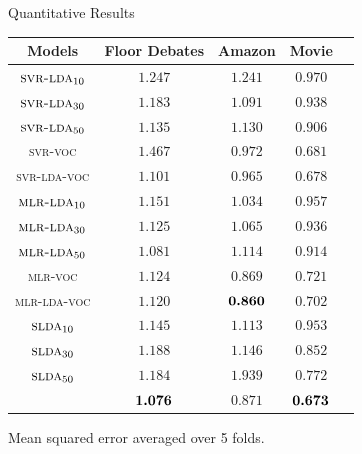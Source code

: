 \documentclass[xcolor=dvipsnames]{beamer}
\newcommand{\abr}[1]{\textsc{#1}}
\newcommand{\lda}[0]{\abr{lda}}
\newcommand{\slda}[0]{\abr{slda}}
\newcommand{\bm}[1]{\mbox{\boldmath$#1$}}
\begin{document}
\begin{frame}{Quantitative Results}

\centering

\begin{tabular}{|c||c|c|c|c|}
  \hline
Models & Floor Debates & Amazon & Movie \\
  \hline
  $\textsc{svr-}\lda{}_{10}$     & $1.247$       & $1.241$ & $0.970$ \\
  $\textsc{svr-}\lda{}_{30}$     & $1.183$       & $1.091$ & $0.938$ \\
  $\textsc{svr-}\lda{}_{50}$     & $1.135$       & $1.130$ & $0.906$ \\
  {\textsc{svr-voc}}             & $1.467$       & $0.972$ & $0.681$\\
  {\textsc{svr-lda-voc}}         & $1.101$       & $0.965$ & $0.678$\\ \hline \hline
  $\textsc{mlr-}\lda{}_{10}$     & $1.151$       & $1.034$ & $0.957$ \\
  $\textsc{mlr-}\lda{}_{30}$     & $1.125$       & $1.065$ &$0.936$ \\
  $\textsc{mlr-}\lda{}_{50}$     & $1.081$       & $1.114$ & $0.914$ \\
  {\textsc{mlr-voc}}             & $1.124$       & $0.869$ & $0.721$\\
  {\textsc{mlr-lda-voc}}         & $1.120$       & $\bm {0.860}$ & $0.702$\\\hline \hline
  $\slda{}_{10}$                 & $1.145$       & $1.113$ & $0.953$\\
  $\slda{}_{30}$                 & $1.188$       & $1.146$ & $0.852$\\
  $\slda{}_{50}$                 & $1.184$       & $1.939$ & $0.772$\\ \hline \hline
  {\shlda{}}                     & $\bm {1.076}$ & $0.871$ & $\bm {0.673}$\\ \hline
\end{tabular}

Mean squared error averaged over 5 folds.
\end{frame}
\end{document}
